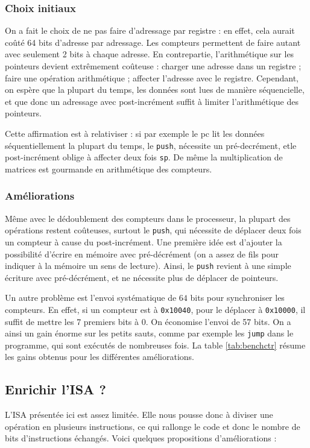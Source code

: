 \documentclass[architecture]{compas2018}
\begin{document}
\subsubsection{Choix initiaux}
On a fait le choix de ne pas faire d'adressage par registre : en effet, cela aurait coûté 64 bits d'adresse par adressage. Les compteurs permettent de faire autant avec seulement 2 bits à chaque adresse. En contrepartie, l'arithmétique sur les pointeurs devient extrêmement coûteuse : charger une adresse dans un registre ; faire une opération arithmétique ; affecter l'adresse avec le registre. Cependant, on espère que la plupart du temps, les données sont lues de manière séquencielle, et que donc un adressage avec post-incrément suffit à limiter l'arithmétique des pointeurs.\par
Cette affirmation est à relativiser : si par exemple le pc lit les données séquentiellement la plupart du temps, le \texttt{push}, nécessite un pré-decrément, etle post-incrément oblige à affecter deux fois \texttt{sp}. De même la multiplication de matrices est gourmande en arithmétique des compteurs.
\subsubsection{Améliorations}
Même avec le dédoublement des compteurs dans le processeur, la plupart des opérations restent coûteuses, surtout le \texttt{push}, qui nécessite de déplacer deux fois un compteur à cause du post-incrément. Une première idée est d'ajouter la possibilité d'écrire en mémoire avec pré-décrément (on a assez de fils pour indiquer à la mémoire un sens de lecture). Ainsi, le \texttt{push} revient à une simple écriture avec pré-décrément, et ne nécessite plus de déplacer de pointeurs.\par
Un autre problème est l'envoi systématique de $64$ bits pour synchroniser les compteurs. En effet, si un compteur est à \texttt{0x10040}, pour le déplacer à \texttt{0x10000}, il suffit de mettre les 7 premiers bits à 0. On économise l'envoi de 57 bits. On a ainsi un gain énorme sur les petits sauts, comme par exemple les \texttt{jump} dans le programme, qui sont exécutés de nombreuses fois. La table \ref{tab:benchctr} résume les gains obtenus pour les différentes améliorations.

\subsection{Enrichir l'ISA ?}

L'ISA présentée ici est assez limitée. Elle nous pousse donc à diviser une opération en plusieurs instructions, ce qui rallonge le code et donc le nombre de bits d'instructions échangés. Voici quelques propositions d'améliorations :
\end{document}
